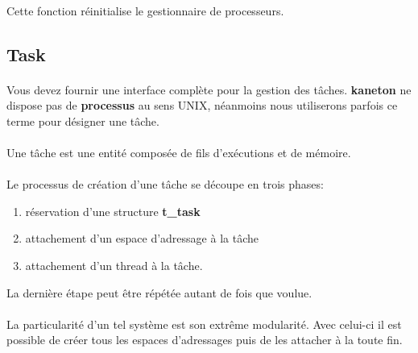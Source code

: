 \documentclass[10pt,a4wide]{article}
\begin{document}
\paragraph{}

Cette fonction r\'einitialise le gestionnaire de processeurs.

\subsection{Task}

\paragraph{}

Vous devez fournir une interface compl\`ete pour la gestion des t\^aches.
\textbf{kaneton} ne dispose pas de \textbf{processus} au sens UNIX, n\'eanmoins
nous utiliserons parfois ce terme pour d\'esigner une t\^ache.

\paragraph{}

Une t\^ache est une entit\'e compos\'ee de fils d'ex\'ecutions et de
m\'emoire.

\paragraph{}

Le processus de cr\'eation d'une t\^ache se d\'ecoupe en trois phases:

\begin{enumerate}

\item r\'eservation d'une structure \textbf{t\_task}

\item attachement d'un espace d'adressage \`a la t\^ache

\item attachement d'un thread \`a la t\^ache.

\end{enumerate}

La derni\`ere \'etape peut \^etre r\'ep\'et\'ee autant de fois que voulue.

\paragraph{}

La particularit\'e d'un tel syst\`eme est son extr\^eme modularit\'e. Avec
celui-ci il est possible de cr\'eer tous les espaces d'adressages puis
de les attacher \`a la toute fin.
\end{document}
